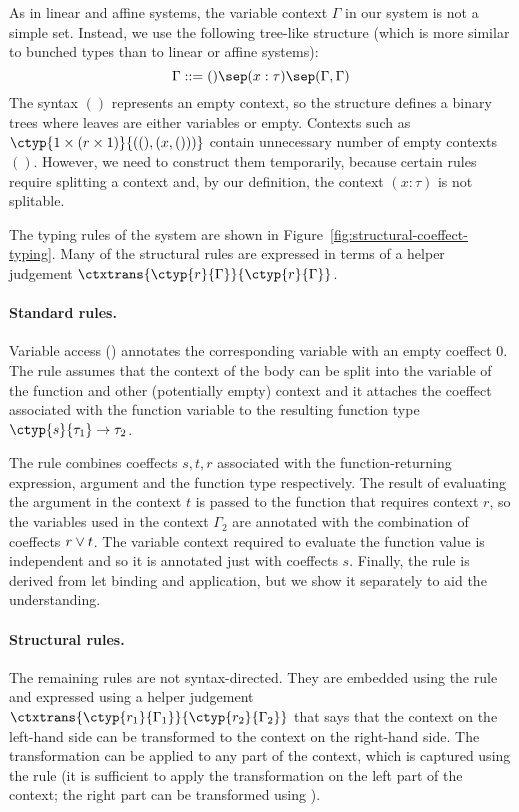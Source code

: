 As in linear and affine systems, the variable context $\Gamma$ in our system is not a 
simple set. Instead, we use the following tree-like structure (which is more similar to 
bunched types than to linear or affine systems):
%
\begin{equation*}
\Gamma ::= () \sep (x:\tau) \sep (\Gamma, \Gamma)
\end{equation*}
%
The syntax $()$ represents an empty context, so the structure defines a binary trees where
leaves are either variables or empty. Contexts such as $\ctyp{1\csprd(r \csprd 1)}{((), (x, ()))}$ 
contain unnecessary number of empty contexts $()$. However, we need to construct them
temporarily, because certain rules require splitting a context and, by our 
definition, the context $(x:\tau)$ is not splitable.

The typing rules of the system are shown in Figure~\ref{fig:structural-coeffect-typing}.
Many of the structural rules are expressed in terms of a helper judgement
$\ctxtrans{\ctyp{r}{\Gamma}}{\ctyp{r}{\Gamma}}$.

\paragraph{Standard rules.}
Variable access () annotates the corresponding variable with an empty coeffect
$0$. The  rule assumes that the context of the body can be split into the
variable of the function and other (potentially empty) context and it attaches the coeffect
associated with the function variable to the resulting function type $\ctyp{s}{\tau_1} \rightarrow \tau_2$.

The  rule combines coeffects $s, t, r$ associated with the function-returning
expression, argument and the function type respectively. 
The result of evaluating the argument in the context $t$ is passed to the function that
requires context $r$, so the variables used in the context $\Gamma_2$ are annotated with
the combination of coeffects $r \vee t$. The variable context required to evaluate the 
function value is independent and so it is annotated just with coeffects $s$.
Finally, the  rule is derived from let binding and application, but we show
it separately to aid the understanding.


\paragraph{Structural rules.}
The remaining rules are not syntax-directed. They are embedded using the 
rule and expressed using a helper judgement $\ctxtrans{\ctyp{r_1}{\Gamma_1}}{\ctyp{r_2}{\Gamma_2}}$
that says that the context on the left-hand side can be transformed to the context on the
right-hand side. The transformation can be applied to any part of the context, which 
is captured using the  rule (it is sufficient to apply the transformation 
on the left part of the context; the right part can be transformed using ).

